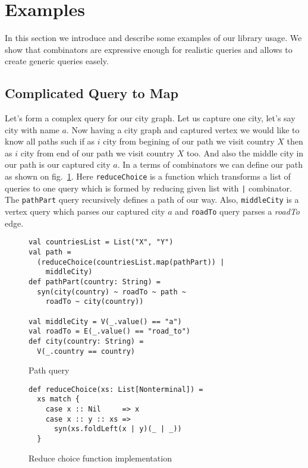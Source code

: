 \section{Examples}

In this section we introduce and describe some examples of our library usage.
We show that combinators are expressive enough for realistic queries and allows to create generic queries easely.

\subsection{Complicated Query to Map}

Let's form a complex query for our city graph. 
Let us capture one city, let's say city with name $a$. 
Now having a city graph and captured vertex we would like to know all paths such if as $i$ city from begining of our path we visit country $X$ then as $i$ city from end of our path we visit country $X$ too. 
And also the middle city in our path is our captured city $a$.
In a terms of combinators we can define our path as shown on fig.~\ref{fig:pathQuery}.
Here \lstinline{reduceChoice} is a function which transforms a list of queries to one query which is formed by reducing given list with \lstinline{|} combinator.
The \lstinline{pathPart} query recursively defines a path of our way.
Also, \lstinline{middleCity} is a vertex query which parses our captured city $a$ and \lstinline{roadTo} query parses a \emph{roadTo} edge.

\begin{figure}[h]
\begin{lstlisting}
val countriesList = List("X", "Y")
val path = 
  (reduceChoice(countriesList.map(pathPart)) | 
    middleCity)
def pathPart(country: String) =
  syn(city(country) ~ roadTo ~ path ~ 
    roadTo ~ city(country))

val middleCity = V(_.value() == "a")
val roadTo = E(_.value() == "road_to")
def city(country: String) =
  V(_.country == country)
\end{lstlisting}
\caption{Path query}
\label{fig:pathQuery}
\end{figure}

\begin{figure}[h]
\begin{lstlisting}
def reduceChoice(xs: List[Nonterminal]) = 
  xs match {
    case x :: Nil     => x
    case x :: y :: xs => 
      syn(xs.foldLeft(x | y)(_ | _))
  }
\end{lstlisting}
\caption{Reduce choice function implementation}
\label{fig:reduceChoice}
\end{figure}

